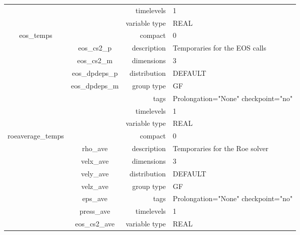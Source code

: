 \documentclass{article}
\begin{document}
\begin{tabular*}{150mm}{|c|c@{\extracolsep{\fill}}|rl|}
 &  & timelevels & 1 \\ 
 &  & variable type & REAL \\ 
\hline 
eos\_temps &  & compact & 0 \\ 
 & eos\_cs2\_p & description & Temporaries for the EOS calls \\ 
 & eos\_cs2\_m & dimensions & 3 \\ 
 & eos\_dpdeps\_p & distribution & DEFAULT \\ 
 & eos\_dpdeps\_m & group type & GF \\ 
 &  & tags & Prolongation="None" checkpoint="no" \\ 
 &  & timelevels & 1 \\ 
 &  & variable type & REAL \\ 
\hline 
roeaverage\_temps &  & compact & 0 \\ 
 & rho\_ave & description & Temporaries for the Roe solver \\ 
 & velx\_ave & dimensions & 3 \\ 
 & vely\_ave & distribution & DEFAULT \\ 
 & velz\_ave & group type & GF \\ 
 & eps\_ave & tags & Prolongation="None" checkpoint="no" \\ 
 & press\_ave & timelevels & 1 \\ 
 & eos\_cs2\_ave & variable type & REAL \\ 
\hline 
\end{tabular*} 



\vspace{5mm}
\vspace{5mm}
\end{document}
